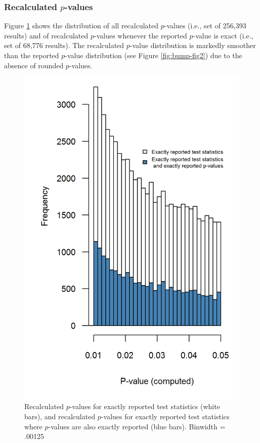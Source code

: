 \documentclass[a5paper]{book}
\begin{document}
\subsubsection{\texorpdfstring{Recalculated
\(p\)-values}{Recalculated p-values}}\label{recalculated-p-values}

Figure \ref{fig:bump-fig4} shows the distribution of all recalculated
\(p\)-values (i.e., set of 256,393 results) and of recalculated
\(p\)-values whenever the reported \(p\)-value is exact (i.e., set of
68,776 results). The recalculated \(p\)-value distribution is markedly
smoother than the reported \(p\)-value distribution (see Figure
\ref{fig:bump-fig2}) due to the absence of rounded \(p\)-values.

\begin{figure}[h]

{\centering \includegraphics[width=0.6\linewidth]{assets/figures/bump-fig4} 

}

\caption{Recalculated $p$-values for exactly reported test statistics (white bars), and recalculated $p$-values for exactly reported test statistics where $p$-values are also exactly reported (blue bars). Binwidth = .00125}\label{fig:bump-fig4}
\end{figure}
\end{document}
